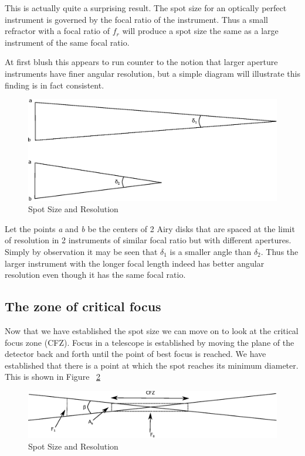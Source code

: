 \documentclass[11pt]{article}
\begin{document}
This is actually quite a surprising result.  The spot size for an optically perfect instrument is governed by the focal ratio of the instrument.  Thus a small refractor with a focal ratio of $f_{r}$ will produce a spot size the same as a large instrument of the same focal ratio.

At first blush this appears to run counter to the notion that larger aperture instruments have finer angular resolution, but a simple diagram will illustrate this finding is in fact consistent.

\begin{figure}[htb]
	\begin{center}
		\includegraphics[scale=0.7]{focal-ratio-resolution.eps}
		\caption{Spot Size and Resolution}
		\label{fig:spot_resolution}
	\end{center}
\end{figure}


Let the points {\em a} and {\em b} be the centers of 2 Airy disks that are spaced at the limit of resolution in 2 instruments of similar focal ratio but with different apertures.  Simply by observation it may be seen that $\delta_{1}$ is a smaller angle than $\delta_{2}$.  Thus the larger instrument with the longer focal length indeed has better angular resolution even though it has the same focal ratio.

\subsection{The zone of critical focus}

Now that we have established the spot size we can move on to look at the critical focus zone (CFZ).  Focus in a telescope is established by moving the plane of the detector back and forth until the point of best focus is reached.  We have established that there is a point at which the spot reaches its minimum diameter.  This is shown in Figure ~\ref{fig:cfz}

\begin{figure}[htb]
	\begin{center}
		\includegraphics[scale=0.7]{CFZ.eps}
		\caption{Spot Size and Resolution}
		\label{fig:cfz}
	\end{center}
\end{figure}
\end{document}
